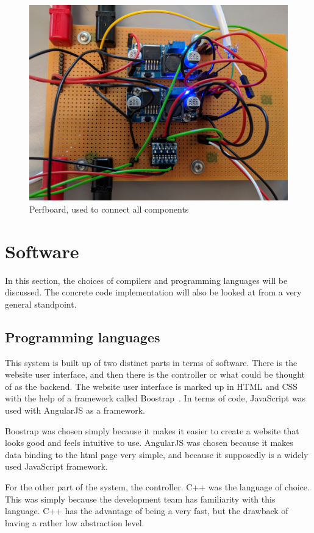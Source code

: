 \begin{figure}[H]
\centering
\includegraphics[width=0.7\linewidth]{../Appendix/Project/Dokumentation/Images/Implementation/integration}
\caption{Perfboard, used to connect all components}
\label{fig:integration}
\end{figure}

\section{Software}
In this section, the choices of compilers and programming languages will be discussed. The concrete code implementation will also be looked at from a very general standpoint.

\subsection{Programming languages}
This system is built up of two distinct parts in terms of software. There is the website user interface, and then there is the controller or what could be thought of as the backend. The website user interface is marked up in HTML and CSS with the help of a framework called Boostrap~\cite{bootstrap}. In terms of code, JavaScript was used with AngularJS as a framework. 

Boostrap was chosen simply because it makes it easier to create a website that looks good and feels intuitive to use. AngularJS was chosen because it makes data binding to the html page very simple, and because it supposedly is a widely used JavaScript framework.

For the other part of the system, the controller. C++ was the language of choice. This was simply because the development team has familiarity with this language. C++ has the advantage of being a very fast, but the drawback of having a rather low abstraction level. 
 
